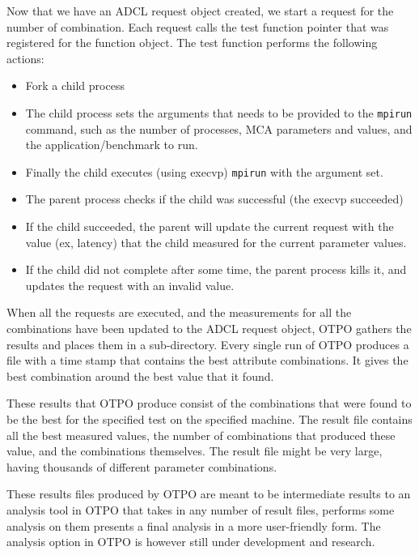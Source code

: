 Now that we have an ADCL request object created, we start a request for the
number of combination. Each request calls the test function pointer that was
registered for the function object. The test function performs the following actions:
\begin{itemize}
\item Fork a child process
\item The child process sets the arguments that needs to be provided to the {\tt mpirun}
  command, such as the number of processes, MCA parameters and values, and the application/benchmark to run.
\item Finally the child executes (using execvp) {\tt mpirun} with the argument
  set.
\item The parent process checks if the child was successful (the execvp succeeded)
\item If the child succeeded, the parent will update the current request with
  the value (ex, latency) that the child measured for the current parameter values.
\item If the child did not complete after some time, the parent process kills it, and
  updates the request with an invalid value.
\end{itemize}

When all the requests are executed, and the measurements for all the
combinations have been updated to the ADCL request object, OTPO gathers the
results and places them in a sub-directory. Every single run of OTPO produces a
file with a time stamp that contains the best attribute combinations. It gives
the best combination around the best value that it found. 

These results that OTPO produce consist of the combinations that
were found to be the best for the specified test on the specified machine. The
result file contains all the best measured values, the number of combinations that
produced these value, and the combinations themselves. The result file might be very large,
having thousands of different parameter combinations. 

These results files produced by OTPO are meant to be intermediate results to
an analysis tool in OTPO that takes in any number of result files, performs some
analysis on them presents a final analysis in a more user-friendly form. The analysis
option in OTPO is however still under development and research.

